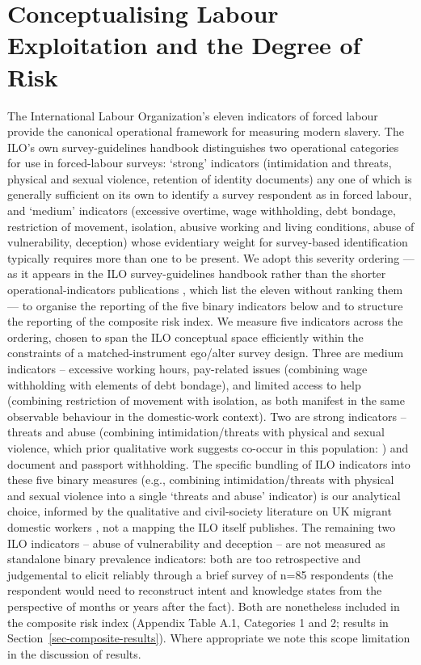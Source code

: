 \documentclass[
  12pt,
  letterpaper,
  DIV=11,
  numbers=noendperiod]{scrartcl}
\begin{document}
\section{Conceptualising Labour Exploitation and the Degree of
Risk}\label{sec-conceptualisation}

The International Labour Organization's eleven indicators of forced
labour \autocite{ILO11-indicators,int25-ilo} provide the canonical
operational framework for measuring modern slavery. The ILO's own
survey-guidelines handbook \autocite{hard24-ilo} distinguishes two
operational categories for use in forced-labour surveys: `strong'
indicators (intimidation and threats, physical and sexual violence,
retention of identity documents) any one of which is generally
sufficient on its own to identify a survey respondent as in forced
labour, and `medium' indicators (excessive overtime, wage withholding,
debt bondage, restriction of movement, isolation, abusive working and
living conditions, abuse of vulnerability, deception) whose evidentiary
weight for survey-based identification typically requires more than one
to be present. We adopt this severity ordering --- as it appears in the
ILO survey-guidelines handbook rather than the shorter
operational-indicators publications
\autocite{ILO11-indicators,int25-ilo}, which list the eleven without
ranking them --- to organise the reporting of the five binary indicators
below and to structure the reporting of the composite risk index. We
measure five indicators across the ordering, chosen to span the ILO
conceptual space efficiently within the constraints of a
matched-instrument ego/alter survey design. Three are medium indicators
-- excessive working hours, pay-related issues (combining wage
withholding with elements of debt bondage), and limited access to help
(combining restriction of movement with isolation, as both manifest in
the same observable behaviour in the domestic-work context). Two are
strong indicators -- threats and abuse (combining intimidation/threats
with physical and sexual violence, which prior qualitative work suggests
co-occur in this population: \textcite{yilm23-exploring}) and document
and passport withholding. The specific bundling of ILO indicators into
these five binary measures (e.g., combining intimidation/threats with
physical and sexual violence into a single `threats and abuse'
indicator) is our analytical choice, informed by the qualitative and
civil-society literature on UK migrant domestic workers
\autocite{kala08-new,mant16-modern,serv23-closed,yilm23-exploring}, not
a mapping the ILO itself publishes. The remaining two ILO indicators --
abuse of vulnerability and deception -- are not measured as standalone
binary prevalence indicators: both are too retrospective and judgemental
to elicit reliably through a brief survey of n=85 respondents (the
respondent would need to reconstruct intent and knowledge states from
the perspective of months or years after the fact). Both are nonetheless
included in the composite risk index (Appendix Table A.1, Categories 1
and 2; results in Section~\ref{sec-composite-results}). Where
appropriate we note this scope limitation in the discussion of results.
\end{document}
